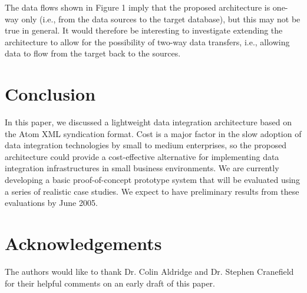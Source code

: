 \documentclass{CRPITStyle}
\begin{document}
The data flows shown in Figure 1 imply that the proposed architecture is
one-way only (i.e., from the data sources to the target database), but
this may not be true in general. It would therefore be interesting to
investigate extending the architecture to allow for the possibility of
two-way data transfers, i.e., allowing data to flow from the target back
to the sources.

\section{Conclusion}

In this paper, we discussed a lightweight data integration architecture
based on the Atom XML syndication format. Cost is a major factor in the
slow adoption of data integration technologies by small to medium
enterprises, so the proposed architecture could provide a cost-effective
alternative for implementing data integration infrastructures in small
business environments. We are currently developing a basic
proof-of-concept prototype system that will be evaluated using a series
of realistic case studies. We expect to have preliminary results from
these evaluations by June 2005.

\section{Acknowledgements}

The authors would like to thank Dr. Colin Aldridge and Dr. Stephen
Cranefield for their helpful comments on an early draft of this paper.




\end{document}
